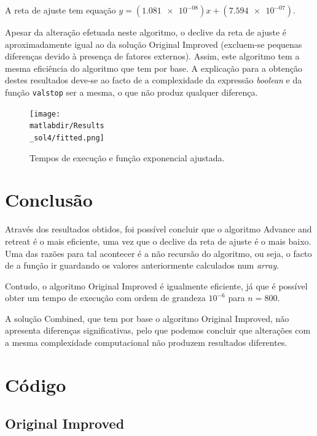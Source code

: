 \documentclass[portuguese,11pt,a4paper,titlepage]{article}
\newcommand{\extrang}[1]{\textit{#1}}
\newcommand{\srcdir}{..}
\newcommand{\matlabdir}{"../MATLAB-fittings"}
\begin{document}
A reta de ajuste tem equação \begin{math}y=(\num{1.081e-08})x+(\num{7.594e-07})\end{math}.

Apesar da alteração efetuada neste algoritmo, o declive da reta de ajuste é aproximadamente igual ao da
solução Original Improved (excluem-se pequenas diferenças devido à presença de fatores externos).
Assim, este algoritmo tem a mesma eficiência do algoritmo que tem por base.
A explicação para a obtenção destes resultados deve-se ao facto de a complexidade da expressão \extrang{boolean}
e da função \verb#valstop# ser a mesma, o que não produz qualquer diferença.

\begin{figure}[h]
	\centering
	\texttt{[image: \\matlabdir/Results\\\_sol4/fitted.png]}
	\caption{Tempos de execução e função exponencial ajustada.}
	\label{fig:sol4}
\end{figure}
\pagebreak

\section{Conclusão}
Através dos resultados obtidos, foi possível concluir que o algoritmo Advance and retreat é o mais eficiente,
uma vez que o declive da reta de ajuste é o mais baixo. Uma das razões para tal acontecer é a não recursão do algoritmo,
ou seja, o facto de a função ir guardando os valores anteriormente calculados num \extrang{array}.

Contudo, o algoritmo Original Improved é igualmente eficiente, já que é possível obter um tempo de execução
com ordem de grandeza \begin{math}10^{-6}\end{math} para \begin{math}n = 800\end{math}.

A solução Combined, que tem por base o algoritmo Original Improved, não apresenta diferenças significativas,
pelo que podemos concluir que alterações com a mesma complexidade computacional não produzem resultados diferentes.

\pagebreak
\section{Código}
\subsection{Original Improved}

\pagebreak
\end{document}
